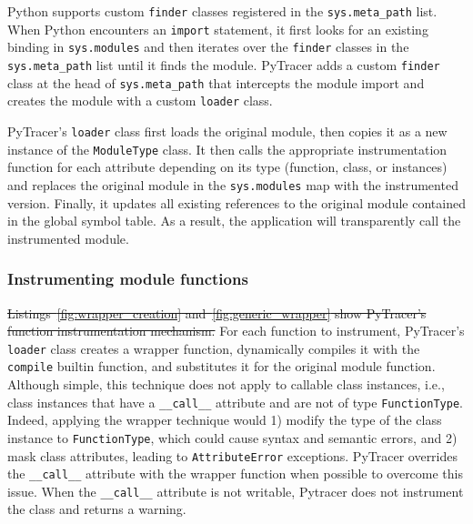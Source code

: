 \documentclass[10pt,journal,compsoc]{IEEEtran}
\newcommand{\pytracer}[0]{PyTracer\xspace}
\DeclareRobustCommand{\remove}[1]{\textcolor{lightred}{\sout{#1}}}
\begin{document}
Python supports custom \texttt{finder} classes registered in the
\texttt{sys.meta\_path} list. When Python encounters an \texttt{import}
statement, it first looks for an existing binding in \texttt{sys.modules} and
then iterates over the \texttt{finder} classes in the \texttt{sys.meta\_path}
list until it finds the module. \pytracer adds a custom \texttt{finder} class at
the head of \texttt{sys.meta\_path} that intercepts the module import and
creates the module with a custom \texttt{loader} class.

\pytracer's \texttt{loader} class first loads the original module, then copies
it as a new instance of the \texttt{ModuleType} class. It then calls the
appropriate instrumentation function for each attribute depending on its type
(function, class, or instances) and replaces the original module in the
\texttt{sys.modules} map with the instrumented version. Finally, it updates all
existing references to the original module contained in the global symbol table.
As a result, the application will transparently call the instrumented module.

\subsubsection{Instrumenting module functions}

\remove{Listings~\mbox{\ref{fig:wrapper_creation}} and~\mbox{\ref{fig:generic_wrapper}} show
    \mbox{\pytracer}'s function instrumentation mechanism.}
For each function to instrument, \pytracer's \texttt{loader} class creates a
wrapper function, dynamically compiles it with the \texttt{compile} builtin
function, and substitutes it for the original module function.  Although simple,
this technique does not apply to callable class instances, i.e., class instances
that have a \texttt{\_\_call\_\_} attribute and are not of type
\texttt{FunctionType}. Indeed, applying the wrapper technique would 1) modify
the type of the class instance to \texttt{FunctionType}, which could cause
syntax and semantic errors, and 2) mask class attributes, leading to
\texttt{AttributeError} exceptions. \pytracer overrides the
\texttt{\_\_call\_\_} attribute with the wrapper function when possible to
overcome this issue. When the \texttt{\_\_call\_\_} attribute is not writable,
Pytracer does not instrument the class and returns a warning. 

\end{document}
